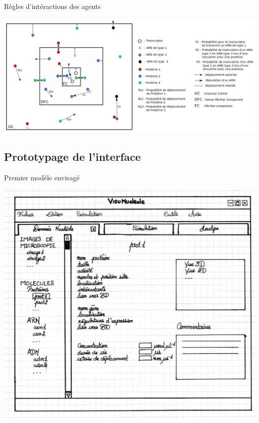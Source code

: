 \documentclass{beamer}
\begin{document}
\begin{frame}
  \begin{block}{Règles d'intéractions des agents}
  \begin{center}
    \includegraphics[width=1\columnwidth]{img/schemaSimu.pdf}
  \end{center}
  \end{block}
\end{frame}

\subsection{Prototypage de l'interface}

\begin{frame}

  \begin{block}{Premier modèle envisagé}
  \begin{center}
    \includegraphics[width=0.7\columnwidth]{img/mock1.png}
  \end{center}
  \end{block}

\end{frame}
\end{document}

